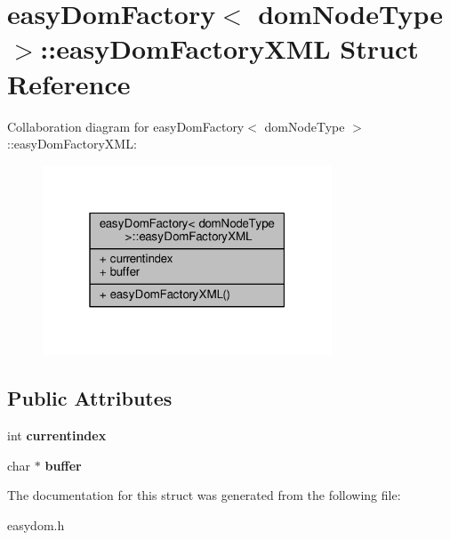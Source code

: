 \hypertarget{structeasyDomFactory_1_1easyDomFactoryXML}{}\section{easy\+Dom\+Factory$<$ dom\+Node\+Type $>$\+:\+:easy\+Dom\+Factory\+X\+ML Struct Reference}
\label{structeasyDomFactory_1_1easyDomFactoryXML}


Collaboration diagram for easy\+Dom\+Factory$<$ dom\+Node\+Type $>$\+:\+:easy\+Dom\+Factory\+X\+ML\+:
\nopagebreak
\begin{figure}[H]
\begin{center}
\leavevmode
\includegraphics[width=244pt]{d9/d03/structeasyDomFactory_1_1easyDomFactoryXML__coll__graph}
\end{center}
\end{figure}
\subsection*{Public Attributes}
\begin{DoxyCompactItemize}
\item 
int {\bfseries currentindex}\hypertarget{structeasyDomFactory_1_1easyDomFactoryXML_afd012fa8658546e5cc75f99d6fec3702}{}\label{structeasyDomFactory_1_1easyDomFactoryXML_afd012fa8658546e5cc75f99d6fec3702}

\item 
char $\ast$ {\bfseries buffer}\hypertarget{structeasyDomFactory_1_1easyDomFactoryXML_a2083ceeccc38d85493081715813eb62e}{}\label{structeasyDomFactory_1_1easyDomFactoryXML_a2083ceeccc38d85493081715813eb62e}

\end{DoxyCompactItemize}


The documentation for this struct was generated from the following file\+:\begin{DoxyCompactItemize}
\item 
easydom.\+h\end{DoxyCompactItemize}
